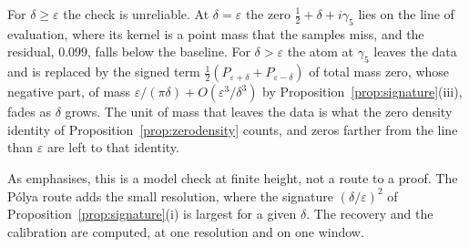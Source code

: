 For $\delta\ge\varepsilon$ the check is unreliable. At $\delta=\varepsilon$ the zero $\frac12+\delta+i\gamma_5$ lies on the line of evaluation, where its kernel is a point mass that the samples miss, and the residual, $0.099$, falls below the baseline. For $\delta>\varepsilon$ the atom at $\gamma_5$ leaves the data and is replaced by the signed term $\frac12(P_{\varepsilon+\delta}+P_{\varepsilon-\delta})$ of total mass zero, whose negative part, of mass $\varepsilon/(\pi\delta)+O(\varepsilon^3/\delta^3)$ by Proposition~\ref{prop:signature}(iii), fades as $\delta$ grows. The unit of mass that leaves the data is what the zero density identity of Proposition~\ref{prop:zerodensity} counts, and zeros farther from the line than $\varepsilon$ are left to that identity.

As \cite[Section 19.3.7]{P26} emphasises, this is a model check at finite height, not a route to a proof. The P\'olya route adds the small resolution, where the signature $(\delta/\varepsilon)^2$ of Proposition~\ref{prop:signature}(i) is largest for a given $\delta$. The recovery and the calibration are computed, at one resolution and on one window.
